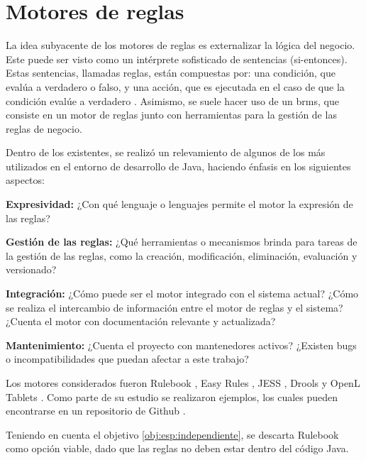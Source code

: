 \section{Motores de reglas}\label{sec:motores}

La idea subyacente de los motores de reglas es externalizar la lógica del negocio. 
Este puede ser visto como un intérprete sofisticado de sentencias  (si-entonces). Estas sentencias, llamadas reglas, están compuestas por: una condición, que evalúa a verdadero o falso, y una acción, que es ejecutada en el caso de que la condición evalúe a verdadero \cite{qusay2005jsr94}.
Asimismo, se suele hacer uso de un \acrfull{brms}, que consiste en un motor de reglas junto con herramientas para la gestión de las reglas de negocio.

Dentro de los existentes, se realizó un relevamiento de algunos de los más utilizados en el entorno de desarrollo de Java, haciendo énfasis en los siguientes aspectos:
\begin{enumerate*}[label=(\alph*)]
    \item 
    \label{comp:expresividad}
    \textbf{Expresividad:}
    ¿Con qué lenguaje o lenguajes permite el motor la expresión de las reglas?
    \item 
    \label{comp:gestion}
    \textbf{Gestión de las reglas:}
    ¿Qué herramientas o mecanismos brinda para tareas de la gestión de las reglas, como la creación, modificación, eliminación, evaluación y versionado?
    \item 
    \label{comp:integracion}
    \textbf{Integración:}
    ¿Cómo puede ser el motor integrado con el sistema actual? ¿Cómo se realiza el intercambio de información entre el motor de reglas y el sistema? ¿Cuenta el motor con documentación relevante y actualizada?
    \item 
    \label{comp:mantenimiento}
    \textbf{Mantenimiento:}
    ¿Cuenta el proyecto con mantenedores activos? ¿Existen bugs o incompatibilidades que puedan afectar a este trabajo?
\end{enumerate*}

Los motores considerados fueron Rulebook \cite{rulebook}, Easy Rules \cite{easy-rules}, JESS \cite{jess}, Drools \cite{drools} y OpenL Tablets \cite{openl}.
Como parte de su estudio se realizaron ejemplos, los cuales pueden encontrarse en un repositorio de Github \cite{ejemplos}.

Teniendo en cuenta el objetivo \ref{obj:esp:independiente}, se descarta Rulebook como opción viable, dado que las reglas no deben estar dentro del código Java.

